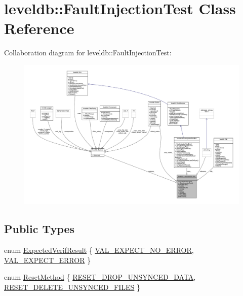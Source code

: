 \hypertarget{classleveldb_1_1_fault_injection_test}{}\section{leveldb\+::Fault\+Injection\+Test Class Reference}
\label{classleveldb_1_1_fault_injection_test}


Collaboration diagram for leveldb\+::Fault\+Injection\+Test\+:
\nopagebreak
\begin{figure}[H]
\begin{center}
\leavevmode
\includegraphics[width=350pt]{classleveldb_1_1_fault_injection_test__coll__graph}
\end{center}
\end{figure}
\subsection*{Public Types}
\begin{DoxyCompactItemize}
\item 
enum \mbox{\hyperlink{classleveldb_1_1_fault_injection_test_a5360c720d3ac8c6618f12400296feef9}{Expected\+Verif\+Result}} \{ \mbox{\hyperlink{classleveldb_1_1_fault_injection_test_a5360c720d3ac8c6618f12400296feef9a7683a5559fa1a7f217b25c44cbd61836}{V\+A\+L\+\_\+\+E\+X\+P\+E\+C\+T\+\_\+\+N\+O\+\_\+\+E\+R\+R\+OR}}, 
\mbox{\hyperlink{classleveldb_1_1_fault_injection_test_a5360c720d3ac8c6618f12400296feef9a233217cab98c7850764ab708e942804a}{V\+A\+L\+\_\+\+E\+X\+P\+E\+C\+T\+\_\+\+E\+R\+R\+OR}}
 \}
\item 
enum \mbox{\hyperlink{classleveldb_1_1_fault_injection_test_a316891ca042a42e0d26ec45450828cc3}{Reset\+Method}} \{ \mbox{\hyperlink{classleveldb_1_1_fault_injection_test_a316891ca042a42e0d26ec45450828cc3a015358eeff960123a9fae83fc21e6c46}{R\+E\+S\+E\+T\+\_\+\+D\+R\+O\+P\+\_\+\+U\+N\+S\+Y\+N\+C\+E\+D\+\_\+\+D\+A\+TA}}, 
\mbox{\hyperlink{classleveldb_1_1_fault_injection_test_a316891ca042a42e0d26ec45450828cc3a0685f7ef65ee539bbc7cd8ce746b9a27}{R\+E\+S\+E\+T\+\_\+\+D\+E\+L\+E\+T\+E\+\_\+\+U\+N\+S\+Y\+N\+C\+E\+D\+\_\+\+F\+I\+L\+ES}}
 \}
\end{DoxyCompactItemize}

